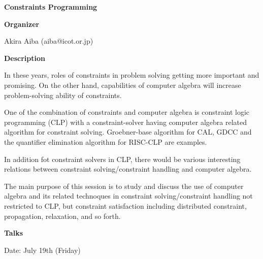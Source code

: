 \begin{center}
{\LARGE \bf Constraints Programming
}
\end{center}
\bigskip

{\bf Organizer}

\medskip

Akira Aiba (aiba@icot.or.jp)

\bigskip

{\bf Description}
\medskip

In these years, roles of constraints in problem solving getting more important and promising. On
the other hand, capabilities of computer algebra will increase problem-solving ability of
constraints. 

One of the combination of constraints and computer algebra is constraint logic programming
(CLP) with a constraint-solver having computer algebra related algorithm for constraint solving.
Groebner-base algorithm for CAL, GDCC and the quantifier elimination algorithm for
RISC-CLP are examples. 

In addition fot constraint solvers in CLP, there would be various interesting relations between
constraint solving/constraint handling and computer algebra. 

The main purpose of this session is to study and discuss the use of computer algebra and its related
technoques in constraint solving/constraint handling not restricted to CLP, but constraint
satisfaction including distributed constraint, propagation, relaxation, and so forth. 

\bigskip
{\bf Talks}
\medskip

Date: July 19th (Friday) 

